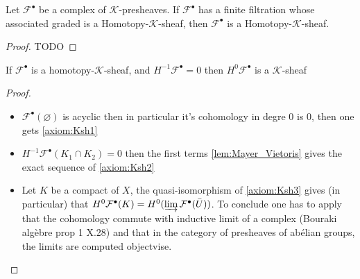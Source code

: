 \begin{lemma}\label{lem:homotpy_k_sheaves_stable_by_extension}
    Let $\mathcal{F}^{\bullet}$ be a complex of $\mathcal{K}$-presheaves. If $\mathcal{F}^{\bullet}$ has a finite filtration whose associated graded is a Homotopy-$\mathcal{K}$-sheaf, then $\mathcal{F}^{\bullet}$ is a Homotopy-$\mathcal{K}$-sheaf.
\end{lemma}

\begin{proof}
    TODO
\end{proof}

\begin{lemma}\label{lem:first_non_zero_homology_of_homotopy_k_sheaf_is_k_sheaf}
    If $\mathcal{F}^{\bullet}$ is a homotopy-$\mathcal{K}$-sheaf, and $H^{-1}\mathcal{F}^{\bullet}=0$ then $H^{0}\mathcal{F}^{\bullet}$ is a $\mathcal{K}$-sheaf
\end{lemma}

\begin{proof}
    \begin{itemize}
        \item $\mathcal{F}^{\bullet}(\varnothing)$ is acyclic then in particular it's cohomology in degre $0$ is $0$, then one gets \eqref{axiom:Ksh1}
        \item $H^{-1}\mathcal{F}^{\bullet}(K_1\cap K_2)=0$ then the first terms \ref{lem:Mayer_Vietoris} gives the exact sequence of \eqref{axiom:Ksh2}
        \item Let $K$ be a compact of $X$, the quasi-isomorphism of \eqref{axiom:Ksh3} gives (in particular) that $H^0\mathcal{F}^{\bullet}(K)=H^0(\varinjlim\mathcal{F}^{\bullet}(\bar{U}))$. To conclude one has to apply that the cohomology commute with inductive limit of a complex (Bouraki algèbre prop 1 X.28) and that in the category of presheaves of abélian groups, the limits are computed objectvise.
    \end{itemize}
\end{proof}




